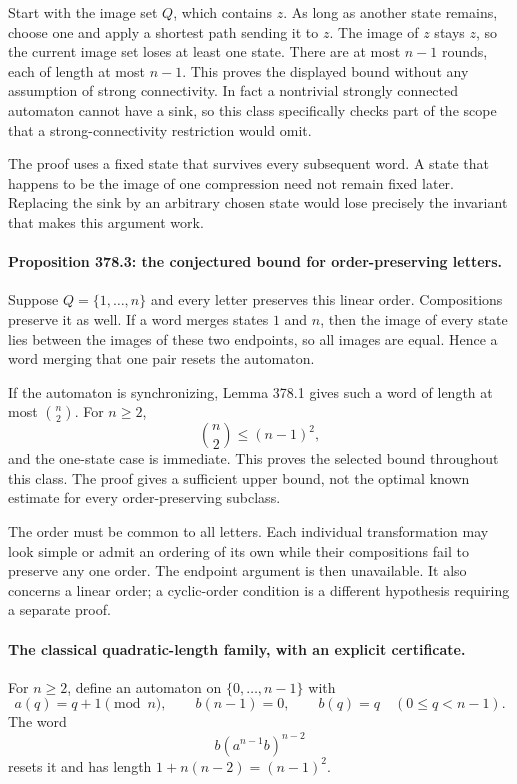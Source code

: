 \documentclass[11pt]{article}
\begin{document}
Start with the image set $Q$, which contains $z$. As long as another state remains, choose one and apply a shortest path sending it to $z$. The image of $z$ stays $z$, so the current image set loses at least one state. There are at most $n-1$ rounds, each of length at most $n-1$. This proves the displayed bound without any assumption of strong connectivity. In fact a nontrivial strongly connected automaton cannot have a sink, so this class specifically checks part of the scope that a strong-connectivity restriction would omit.

The proof uses a fixed state that survives every subsequent word. A state that happens to be the image of one compression need not remain fixed later. Replacing the sink by an arbitrary chosen state would lose precisely the invariant that makes this argument work.

\paragraph{Proposition 378.3: the conjectured bound for order-preserving letters.}
Suppose $Q=\{1,\ldots,n\}$ and every letter preserves this linear order. Compositions preserve it as well. If a word merges states $1$ and $n$, then the image of every state lies between the images of these two endpoints, so all images are equal. Hence a word merging that one pair resets the automaton.

If the automaton is synchronizing, Lemma 378.1 gives such a word of length at most $\binom n2$. For $n\geq2$,
\[
                           \binom n2\leq(n-1)^2,
\]
and the one-state case is immediate. This proves the selected bound throughout this class. The proof gives a sufficient upper bound, not the optimal known estimate for every order-preserving subclass.

The order must be common to all letters. Each individual transformation may look simple or admit an ordering of its own while their compositions fail to preserve any one order. The endpoint argument is then unavailable. It also concerns a linear order; a cyclic-order condition is a different hypothesis requiring a separate proof.

\paragraph{The classical quadratic-length family, with an explicit certificate.}
For $n\geq2$, define an automaton on $\{0,\ldots,n-1\}$ with
\[
 a(q)=q+1\pmod n,\qquad
 b(n-1)=0,\qquad b(q)=q\quad(0\leq q<n-1).
\]
The word
\begin{equation}\label{a378:cernyword}
                           b(a^{n-1}b)^{n-2}
\end{equation}
resets it and has length $1+n(n-2)=(n-1)^2$.
\end{document}

